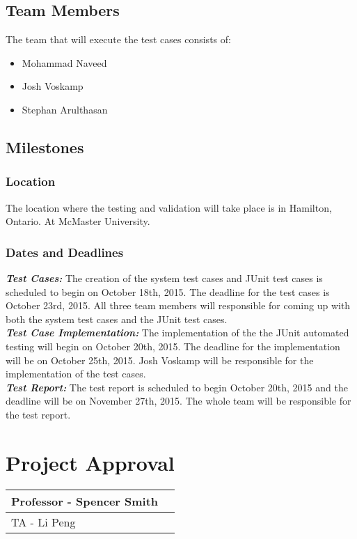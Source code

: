 \documentclass[12pt]{article}
\begin{document}
\subsection{Team Members}
The team that will execute the test cases consists of:

\begin{itemize}
	\item Mohammad Naveed
	\item Josh Voskamp
	\item Stephan Arulthasan
\end{itemize}

\subsection{Milestones}

\subsubsection{Location}
The location where the testing and validation will take place is in Hamilton, 
Ontario. At McMaster University.

\subsubsection{Dates and Deadlines}
\textbf{\emph{Test Cases:}}
The creation of the system test cases and JUnit test cases is scheduled to 
begin on October 18th, 2015. The deadline for the test cases is October 23rd, 
2015. All three team members will responsible for coming up with both the 
system test cases and the JUnit test cases.\\
\textbf{\emph{Test Case Implementation:}}
The implementation of the the JUnit automated testing will begin on October 
20th, 2015. The deadline for the implementation will be on October 25th, 2015. 
Josh Voskamp will be responsible for the implementation of the test cases.\\
\textbf{\emph{Test Report:}}
The test report is scheduled to begin October 20th, 2015 and the deadline will 
be on November 27th, 2015. The whole team will be responsible for the test 
report.

\section{Project Approval}

\begin{center}
	\begin{tabular}{ | p{5cm} | p{5cm} |}
		\hline
		Professor - Spencer Smith &  \\ \hline
		TA - Li Peng &  \\ \hline
	\end{tabular}
\end{center}
\end{document}
